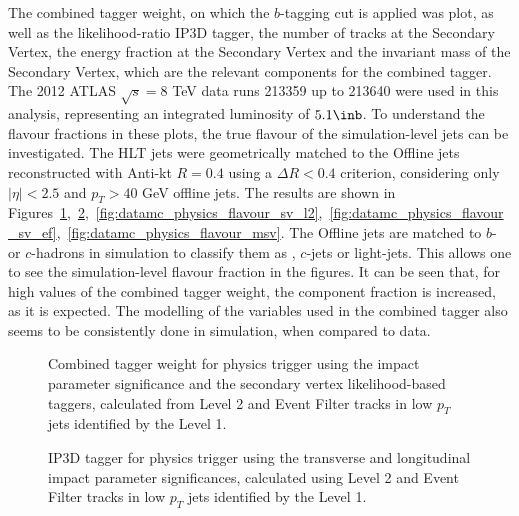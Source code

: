 The combined tagger weight, on which the $b$-tagging cut is applied was plot, as well as the likelihood-ratio IP3D tagger, the number of tracks
at the Secondary Vertex, the energy fraction at the Secondary Vertex and the invariant mass of the Secondary Vertex, which are the relevant components for the combined tagger.
The 2012 ATLAS $\sqrt{s} = 8$ TeV data runs 213359 up to 213640 were used in this analysis, representing an integrated luminosity of $5.1 \inb$.
To understand the flavour fractions in these plots, the true flavour of the simulation-level jets can be investigated.
The HLT jets were geometrically matched to the Offline jets reconstructed with Anti-kt $R=0.4$ using a $\Delta R < 0.4$ criterion,
considering only $|\eta| < 2.5$ and $p_T > 40$ GeV offline jets.
The results are shown in Figures~\ref{fig:datamc_physics_flavour_comb},~\ref{fig:datamc_physics_flavour_ip3d},~\ref{fig:datamc_physics_flavour_sv_l2},~\ref{fig:datamc_physics_flavour_sv_ef},~\ref{fig:datamc_physics_flavour_msv}.
The Offline jets are matched to $b$- or $c$-hadrons in simulation to classify them as \bjets, $c$-jets or light-jets.
This allows one to see the simulation-level flavour fraction in the figures.
It can be seen that, for high values of the combined tagger weight, the \bjet component fraction is increased, as it is expected.
The modelling of the variables used in the combined tagger also seems to be consistently done in simulation, when compared to data.

\begin{figure}[H]
\caption{Combined tagger weight for physics trigger using the impact parameter significance and the secondary vertex likelihood-based taggers, calculated from Level 2 and Event Filter tracks in low $p_T$ jets identified by the Level 1.}
\label{fig:datamc_physics_flavour_comb}
\end{figure}

\begin{figure}[H]
\caption{IP3D tagger for physics trigger using the transverse and longitudinal impact parameter significances, calculated using Level 2 and Event Filter tracks in low $p_T$ jets identified by the Level 1.}
\label{fig:datamc_physics_flavour_ip3d}
\end{figure}

